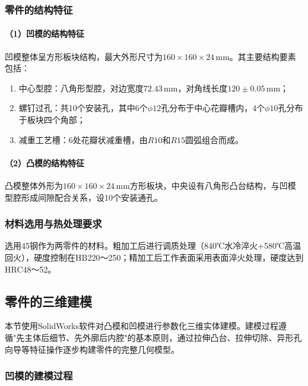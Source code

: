 \documentclass{xautCADreport}
\begin{document}
\subsubsection{零件的结构特征}

\paragraph{（1）凹模的结构特征}

凹模整体呈方形板块结构，最大外形尺寸为$160\times160\times24\,\mathrm{mm}$。其主要结构要素包括：
\begin{enumerate}
  \item 中心型腔：八角形型腔，对边宽度$72.43\,\mathrm{mm}$，对角线长度$120\pm0.05\,\mathrm{mm}$；
  \item 螺钉过孔：共10个安装孔，其中6个$\phi12$孔分布于中心花瓣槽内，4个$\phi10$孔分布于板块四个角部；
  \item 减重工艺槽：6处花瓣状减重槽，由$R10$和$R15$圆弧组合而成。
\end{enumerate}

\paragraph{（2）凸模的结构特征}

凸模整体外形为$160\times160\times24\,\mathrm{mm}$方形板块，中央设有八角形凸台结构，与凹模型腔形成间隙配合关系，设10个安装通孔。

\subsubsection{材料选用与热处理要求}

选用45钢作为两零件的材料。粗加工后进行调质处理（840℃水冷淬火+580℃高温回火），硬度控制在HB220～250；精加工后工作表面采用表面淬火处理，硬度达到HRC48～52。

\subsection{零件的三维建模}

本节使用SolidWorks软件对凸模和凹模进行参数化三维实体建模。建模过程遵循"先主体后细节、先外廓后内腔"的基本原则，通过拉伸凸台、拉伸切除、异形孔向导等特征操作逐步构建零件的完整几何模型。

\subsubsection{凹模的建模过程}
\end{document}
